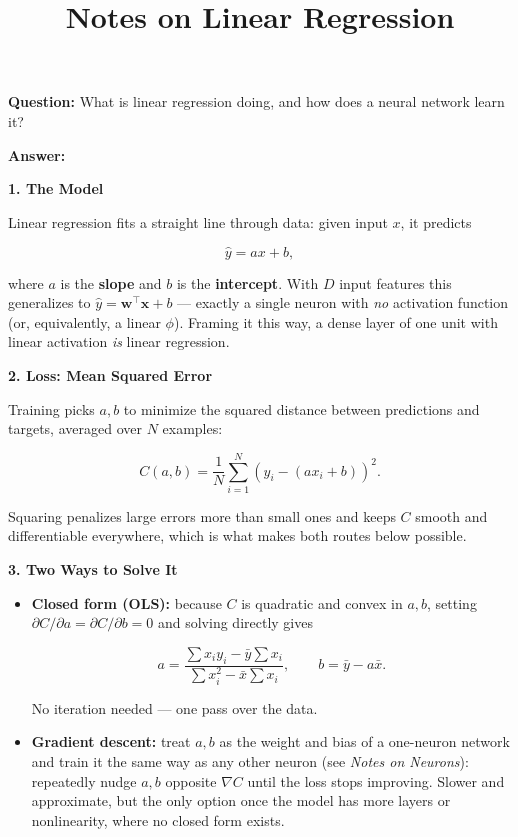\documentclass[conference]{IEEEtran}
\title{Notes on Linear Regression}
\author{
\IEEEauthorblockN{Luis Mendez}
}
\begin{document}
\maketitle

\textbf{Question:} What is linear regression doing, and how does a
neural network learn it?

\bigskip

\textbf{Answer:}

\bigskip

\textbf{1. The Model}

Linear regression fits a straight line through data: given input $x$, it
predicts

\[
  \hat{y} = a x + b,
\]

where $a$ is the \textbf{slope} and $b$ is the \textbf{intercept}. With
$D$ input features this generalizes to $\hat{y} = \mathbf{w}^\top
\mathbf{x} + b$ --- exactly a single neuron with \emph{no} activation
function (or, equivalently, a linear $\phi$). Framing it this way, a
dense layer of one unit with linear activation \emph{is} linear
regression.

\bigskip

\textbf{2. Loss: Mean Squared Error}

Training picks $a, b$ to minimize the squared distance between
predictions and targets, averaged over $N$ examples:

\[
  C(a,b) = \frac{1}{N}\sum_{i=1}^{N} \left(y_i - (a x_i + b)\right)^2.
\]

Squaring penalizes large errors more than small ones and keeps $C$
smooth and differentiable everywhere, which is what makes both routes
below possible.

\bigskip

\textbf{3. Two Ways to Solve It}

\begin{itemize}
    \item \textbf{Closed form (OLS):} because $C$ is quadratic and
          convex in $a,b$, setting $\partial C/\partial a =
          \partial C/\partial b = 0$ and solving directly gives

\[
  a = \frac{\displaystyle\sum x_i y_i - \bar{y}\sum x_i}
           {\displaystyle\sum x_i^2 - \bar{x}\sum x_i},
  \qquad
  b = \bar{y} - a\bar{x}.
\]

          No iteration needed --- one pass over the data.
    \item \textbf{Gradient descent:} treat $a,b$ as the weight and bias
          of a one-neuron network and train it the same way as any
          other neuron (see \textit{Notes on Neurons}): repeatedly
          nudge $a,b$ opposite $\nabla C$ until the loss stops
          improving. Slower and approximate, but the only option once
          the model has more layers or nonlinearity, where no closed
          form exists.
\end{itemize}
\end{document}
